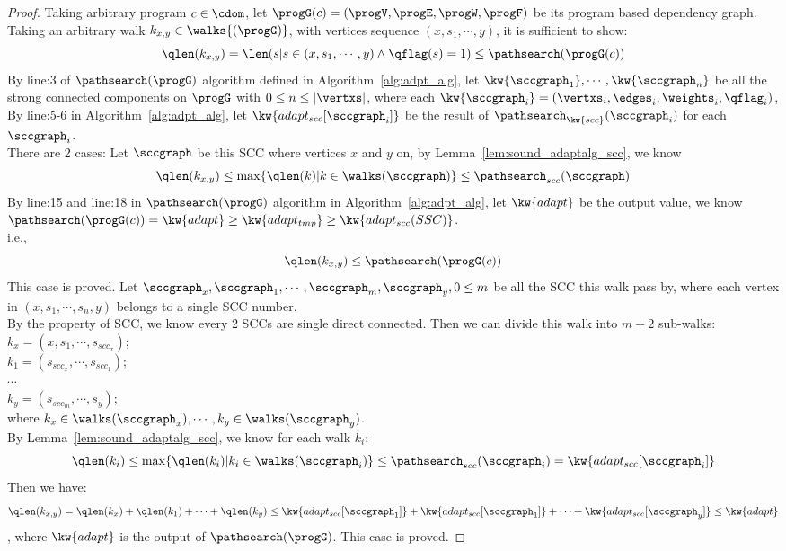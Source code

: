 \begin{proof}
  Taking arbitrary program $c \in \cdom$, let $\progG(c) = (\progV, \progE, \progW, \progF)$ be its 
  program based dependency graph.
  \\
  Taking an arbitrary walk $k_{x,y} \in \walks{(\progG)}$, with vertices sequence
  $(x, s_1, \cdots, y)$, it is sufficient to show:
  \[
    \qlen(k_{x,y}) = \len(s | s \in (x, s_1, \cdots, y) \land \qflag(s) = 1) \leq \pathsearch(\progG(c))
  \]
  By line:3 of $\pathsearch(\progG)$ algorithm defined in Algorithm~\ref{alg:adpt_alg}, let $\kw{\sccgraph_1}, \cdots, \kw{\sccgraph_n}$ be all the strong connected components on $\progG$ with $0 \leq n \leq |\vertxs|$,
  where each $\kw{\sccgraph_i} = (\vertxs_i, \edges_i, \weights_i, \qflag_i)$,
  \\
  By line:5-6 in Algorithm~\ref{alg:adpt_alg}, let $\kw{adapt_{scc}[\sccgraph_i]}$ be the result of $\pathsearch_{\kw{scc}}(\sccgraph_i)$ for each $\sccgraph_i$.
  \\
  There are 2 cases:
  Let  $\sccgraph$ be this SCC where vertices $x$ and $y$ on, by Lemma~\ref{lem:sound_adaptalg_scc}, we know
  \[
    \qlen(k_{x,y}) \leq \max\{\qlen(k) | k \in \walks(\sccgraph)\} \leq \pathsearch_{scc}(\sccgraph)
  \]
%
By line:15 and line:18 in $\pathsearch(\progG)$ algorithm in Algorithm~\ref{alg:adpt_alg}, 
let $\kw{adapt}$ be the output value,
we know $\pathsearch(\progG(c))  = \kw{adapt} \geq \kw{adapt_{tmp}} \geq  \kw{adapt_{scc}(SSC)} $.
\\
i.e., 
\[
  \qlen(k_{x,y}) \leq \pathsearch(\progG(c)) 
  \]
This case is proved.
%
%
Let $\sccgraph_x, \sccgraph_1, \cdots, \sccgraph_m, \sccgraph_y, 0 \leq m$ be all the SCC this walk pass by, where each vertex in 
$(x, s_1, \cdots, s_n, y) $ belongs to a single SCC number. 
\\
By the property of SCC, we know every 2 SCCs are single direct connected. Then we can divide this walk into $m+2$ sub-walks:
\\
$k_x = (x, s_1, \cdots, s_{scc_x})$;
\\
$k_1 = (s_{scc_x}, \cdots, s_{scc_1})$;
\\
$\cdots$
\\
$k_y = (s_{scc_m}, \cdots, s_y)$;
\\
where $k_x \in \walks(\sccgraph_x), \cdots, k_y \in \walks(\sccgraph_y)$.
\\
By Lemma~\ref{lem:sound_adaptalg_scc}, we know for each walk $k_i$:
\[ \qlen(k_i) \leq \max\{\qlen(k_i) | k_i \in \walks(\sccgraph_i)\} \leq \pathsearch_{scc}(\sccgraph_i) = \kw{adapt_{scc}[\sccgraph_i]} \]
%
Then we have:
\[ 
  \qlen(k_{x,y}) = \qlen(k_x) + \qlen(k_1) + \cdots + \qlen(k_y) \leq 
  \kw{adapt_{scc}[\sccgraph_1]} + \kw{adapt_{scc}[\sccgraph_1]}  + \cdots + \kw{adapt_{scc}[\sccgraph_y]}
  \leq \kw{adapt}
  \]
, where $\kw{adapt}$ is the output of $\pathsearch(\progG)$.
This case is proved.
\end{proof}


